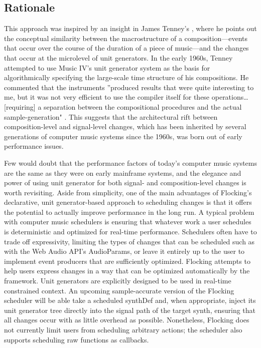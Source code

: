 \documentclass{article}
\begin{document}
\subsection{Rationale}

This approach was inspired by an insight in James Tenney's \cite{tenney1969computer}, where he points out the conceptual similarity between the macrostructure of a composition---events that occur over the course of the duration of a piece of music---and the changes that occur at the microlevel of unit generators. In the early 1960s, Tenney attempted to use Music IV's unit generator system as the basis for algorithmically specifying the large-scale time structure of his compositions. He commented that the instruments ''produced results that were quite interesting to me, but it was not very efficient to use the compiler itself for these operations\ldots [requiring] a separation between the compositional procedures and the actual sample-generation" \cite[p.41--42]{tenney1969computer}. This suggests that the architectural rift between composition-level and signal-level changes, which has been inherited by several generations of computer music systems since the 1960s, was born out of early performance issues.

Few would doubt that the performance factors of today's computer music systems are the same as they were on early mainframe systems, and the elegance and power of using unit generator for both signal- and composition-level changes is worth revisiting. Aside from simplicity, one of the main advantages of Flocking's declarative, unit generator-based approach to scheduling changes is that it offers the potential to actually improve performance in the long run. A typical problem with computer music schedulers is ensuring that whatever work a user schedules is deterministic and optimized for real-time performance. Schedulers often have to trade off expressivity, limiting the types of changes that can be scheduled such as with the Web Audio API's AudioParams, or leave it entirely up to the user to implement event producers that are sufficiently optimized. Flocking attempts to help users express changes in a way that can be optimized automatically by the framework. Unit generators are explicitly designed to be used in real-time constrained context. An upcoming sample-accurate version of the Flocking scheduler will be able take a scheduled synthDef and, when appropriate, inject its unit generator tree directly into the signal path of the target synth, ensuring that all changes occur with as little overhead as possible. Nonetheless, Flocking does not currently limit users from scheduling arbitrary actions; the scheduler also supports scheduling raw functions as callbacks.
\end{document}
